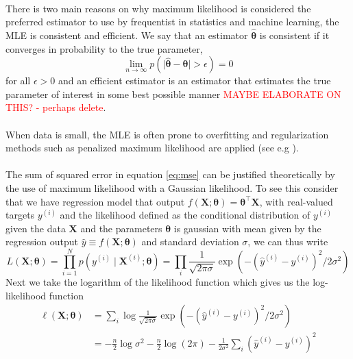 \\
There is two main reasons on why maximum likelihood is considered the preferred estimator to use by frequentist in statistics and machine learning, the MLE is consistent and efficient. We say that an estimator $\hat{\boldsymbol{\theta}}$ is consistent if it converges in probability to the true parameter,
\begin{equation*}
    \lim_{n \rightarrow \infty} p\left(\mid\hat{\boldsymbol{\theta}}-\boldsymbol{\theta}\mid > \epsilon\right)=0
\end{equation*}
for all $\epsilon>0$ and an efficient estimator is an estimator that estimates the true parameter of interest in some best possible manner \textcolor{red}{MAYBE ELABORATE ON THIS? - perhaps delete}. \\
\\
When data is small, the MLE is often prone to overfitting and regularization methods such as penalized maximum likelihood are applied (see e.g \cite{hastie01statisticallearning}).\\
\\
The sum of squared error in equation \ref{eq:mse} can be justified theoretically by the use of maximum likelihood with a Gaussian likelihood.
To see this consider that we have regression model that output $f(\mathbf{X};\boldsymbol{\theta})=\boldsymbol{\theta}^\top\mathbf{X}$, with real-valued targets $y^{(i)}$ and the likelihood defined as the conditional distribution of $y^{(i)}$ given the data $\mathbf{X}$ and the parameters $\boldsymbol{\theta}$ is gaussian with mean given by the regression output $\hat{y}\equiv f(\mathbf{X};\boldsymbol{\theta})$ and standard deviation $\sigma$, we can thus write
\begin{equation*}
    L(\mathbf{X};\boldsymbol{\theta})=\prod_{i=1}^{N} p\left(y^{(i)} \mid \mathbf{X}^{(i)} ; \boldsymbol{\theta}\right)=\prod_i\frac{1}{\sqrt{2\pi\sigma}}\exp\left(-(\hat{y}^{(i)}-y^{(i)})^2/2\sigma^2\right)
\end{equation*}
Next we take the
logarithm of the likelihood function which gives us the log-likelihood function
\begin{equation*}
\begin{split}
        \ell(\mathbf{X};\boldsymbol{\theta})&=\sum_i\log\frac{1}{\sqrt{2\pi\sigma}}\exp\left(-(\hat{y}^{(i)}-y^{(i)})^2/2\sigma^2\right)\\
        &=-\frac{n}{2} \log \sigma^{2}-\frac{n}{2} \log (2 \pi)-\frac{1}{2 \sigma^{2}} \sum_{i}\left(\hat{y}^{(i)}-y^{(i)}\right)^{2}
\end{split}
\end{equation*}
